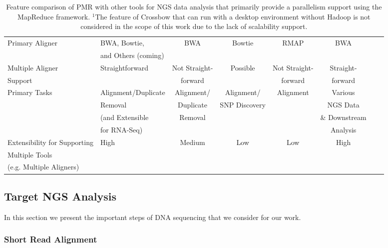 \documentclass{acm_proc_article-sp}
\begin{document}
\begin{center}
\begin{table}[ht]
{\begin{tabular}{|l|l|c|c|c|c|c|c|}
Primary Aligner &  BWA, Bowtie,  &  BWA & Bowtie & RMAP &  BWA \\
& and Others (coming) &  &  &  &  \\ \hline
Multiple Aligner  & Straightforward & Not Straight- & Possible & Not Straight-  & Straight-  \\ 
Support &  & forward &   & forward  & forward \\\hline
Primary Tasks & Alignment/Duplicate  & Alignment/ & Alignment/ & Alignment &Various\\
  &  Removal & Duplicate & SNP Discovery & & NGS Data  \\  
           & (and Extensible &  Removal & &  & \& Downstream  \\
           & for RNA-Seq) & & &  & Analysis \\ \hline  
Extensibility for Supporting  &  High  & Medium &  Low & Low & High      \\
Multiple Tools  &      &  &  &  &   \\ 
(e.g. Multiple Aligners) & & & & & \\ \hline
\hline
\end{tabular}}
\hfill{}
\caption{Feature comparison of PMR with other tools for NGS data analysis that primarily provide a parallelism support using the MapReduce framework.  $^{1}${The feature of Crossbow that can run with a desktop environment without Hadoop is not considered in the scope of this work due to the lack of scalability support.} }
 \label{table:mr-comparison}
\end{table}
\end{center}


\subsection{Target NGS Analysis}

In this section we present the important steps of DNA sequencing that
we consider for our work.

\subsubsection{Short Read Alignment}
\end{document}
